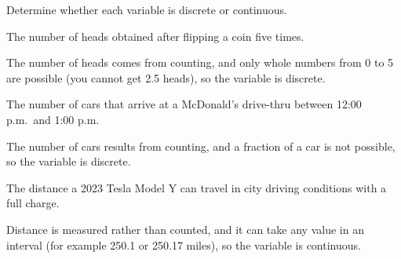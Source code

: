 \documentclass{ximera}
\begin{document}
\begin{problem}
Determine whether each variable is discrete or continuous.

\begin{question}
The number of heads obtained after flipping a coin five times.
\begin{multipleChoice}
\end{multipleChoice}
\begin{explanation}
The number of heads comes from counting, and only whole numbers from 0 to 5 are possible (you cannot get 2.5 heads), so the variable is discrete.
\end{explanation}
\end{question}

\begin{question}
The number of cars that arrive at a McDonald's drive-thru between 12:00 p.m.\ and 1:00 p.m.
\begin{multipleChoice}
\end{multipleChoice}
\begin{explanation}
The number of cars results from counting, and a fraction of a car is not possible, so the variable is discrete.
\end{explanation}
\end{question}

\begin{question}
The distance a 2023 Tesla Model Y can travel in city driving conditions with a full charge.
\begin{multipleChoice}
\end{multipleChoice}
\begin{explanation}
Distance is measured rather than counted, and it can take any value in an interval (for example 250.1 or 250.17 miles), so the variable is continuous.
\end{explanation}
\end{question}
\end{problem}
\end{document}
